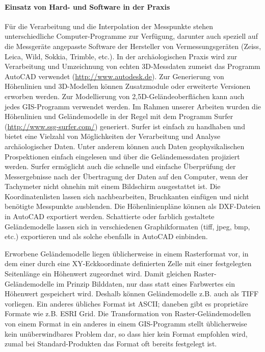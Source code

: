\paragraph{Einsatz von Hard- und Software in der Praxis}
Für die Verarbeitung und die Interpolation der Messpunkte stehen unterschiedliche Computer-Programme zur Verfügung, darunter auch speziell auf die Messgeräte angepasste Software der Hersteller von Vermessungsgeräten (Zeiss, Leica, Wild, Sokkia, Trimble, etc.). In der archäologischen Praxis wird zur Verarbeitung und Umzeichnung von echten 3D-Messdaten zumeist das Programm AutoCAD verwendet (\url{http://www.autodesk.de}). Zur Generierung von Höhenlinien und 3D-Modellen können Zusatzmodule oder erweiterte Versionen erworben werden. Zur Modellierung von 2,5D-Geländeoberflächen kann auch jedes GIS-Programm verwendet werden.
Im Rahmen unserer Arbeiten wurden die Höhenlinien und Geländemodelle in der Regel mit dem Programm Surfer (\url{http://www.ssg-surfer.com/}) generiert. Surfer ist einfach zu handhaben und bietet eine Vielzahl von Möglichkeiten der Verarbeitung und Analyse archäologischer Daten. Unter anderem können auch Daten geophysikalischen Prospektionen einfach eingelesen und über die Geländemessdaten projiziert werden. Surfer ermöglicht auch die schnelle und einfache Überprüfung der Messergebnisse nach der Übertragung der Daten auf den Computer, wenn der Tachymeter nicht ohnehin mit einem Bildschirm ausgestattet ist. Die Koordinatenlisten lassen sich nachbearbeiten, Bruchkanten einfügen und nicht benötigte Messpunkte ausblenden. Die Höhenlinienpläne können als DXF-Dateien in AutoCAD exportiert werden. Schattierte oder farblich gestaltete Geländemodelle lassen sich in verschiedenen Graphikformaten (tiff, jpeg, bmp, etc.) exportieren und als solche ebenfalls in AutoCAD einbinden.

Erworbene Geländemodelle liegen üblicherweise in einem Rasterformat vor, in dem einer durch eine XY-Eckkoordinate definierten Zelle mit einer festgelegten Seitenlänge ein Höhenwert zugeordnet wird. Damit gleichen Raster-Geländemodelle im Prinzip Bilddaten, nur dass statt eines Farbwertes ein Höhenwert gespeichert wird. Deshalb können Geländemodelle z.B. auch als TIFF vorliegen. Ein anderes übliches Format ist ASCII; daneben gibt es proprietäre Formate wie z.B. ESRI Grid. Die Transformation von Raster-Geländemodellen von einem Format in ein anderes in einem GIS-Programm stellt üblicherweise kein unüberwindbares Problem dar, so dass hier kein Format empfohlen wird, zumal bei Standard-Produkten das Format oft bereits festgelegt ist.

